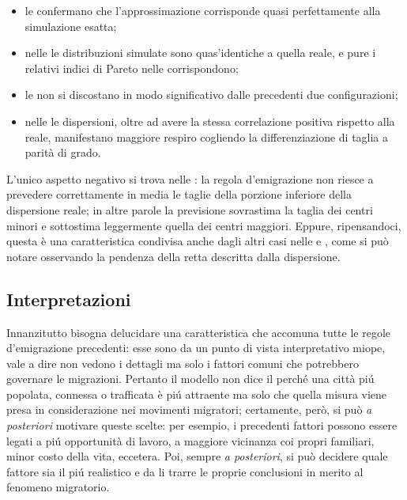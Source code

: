      \begin{itemize}[
        label=\(\diamond\),
      ]
        \item le  confermano che l'approssimazione corrisponde quasi perfettamente alla simulazione esatta;
        \item nelle  le distribuzioni simulate sono quas'identiche a quella reale, e pure i relativi indici di Pareto nelle  corrispondono;
        \item le  non si discostano in modo significativo dalle precedenti due configurazioni;
        \item nelle  le dispersioni, oltre ad avere la stessa correlazione positiva rispetto alla reale, manifestano maggiore respiro cogliendo la differenziazione di taglia a parità di grado.
      \end{itemize}

      L'unico aspetto negativo si trova nelle : la regola d'emigrazione non riesce a prevedere correttamente in media le taglie della porzione inferiore della dispersione reale; in altre parole la previsione sovrastima la taglia dei centri minori e sottostima leggermente quella dei centri maggiori. Eppure, ripensandoci, questa è una caratteristica condivisa anche dagli altri casi nelle  e , come si può notare osservando la pendenza della retta descritta dalla dispersione.

    \subsection{Interpretazioni}\label{secInterpretazioni}

      Innanzitutto bisogna delucidare una caratteristica che accomuna tutte le regole d'emigrazione precedenti: esse sono da un punto di vista interpretativo miope, vale a dire non vedono i dettagli ma solo i fattori comuni che potrebbero governare le migrazioni. Pertanto il modello non dice il perché una città piú popolata, connessa o trafficata è piú attraente ma solo che quella misura viene presa in considerazione nei movimenti migratori; certamente, però, si può \textit{a posteriori} motivare queste scelte: per esempio, i precedenti fattori possono essere legati a piú opportunità di lavoro, a maggiore vicinanza coi propri familiari, minor costo della vita, eccetera. Poi, sempre \textit{a posteriori}, si può decidere quale fattore sia il piú realistico e da li trarre le proprie conclusioni in merito al fenomeno migratorio.

